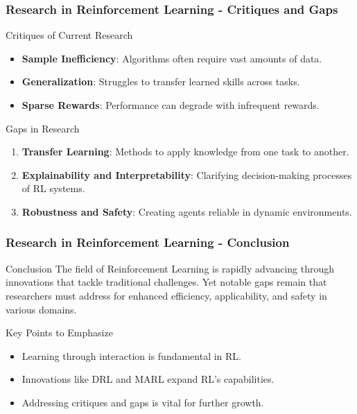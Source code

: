 \documentclass[aspectratio=169]{beamer}
\begin{document}
\begin{frame}[fragile]
    \frametitle{Research in Reinforcement Learning - Critiques and Gaps}
    \begin{block}{Critiques of Current Research}
        \begin{itemize}
            \item \textbf{Sample Inefficiency}: Algorithms often require vast amounts of data.
            \item \textbf{Generalization}: Struggles to transfer learned skills across tasks.
            \item \textbf{Sparse Rewards}: Performance can degrade with infrequent rewards.
        \end{itemize}
    \end{block}

    \begin{block}{Gaps in Research}
        \begin{enumerate}
            \item \textbf{Transfer Learning}: Methods to apply knowledge from one task to another.
            \item \textbf{Explainability and Interpretability}: Clarifying decision-making processes of RL systems.
            \item \textbf{Robustness and Safety}: Creating agents reliable in dynamic environments.
        \end{enumerate}
    \end{block}
\end{frame}

\begin{frame}[fragile]
    \frametitle{Research in Reinforcement Learning - Conclusion}
    \begin{block}{Conclusion}
        The field of Reinforcement Learning is rapidly advancing through innovations that tackle traditional challenges. Yet notable gaps remain that researchers must address for enhanced efficiency, applicability, and safety in various domains.
    \end{block}

    \begin{block}{Key Points to Emphasize}
        \begin{itemize}
            \item Learning through interaction is fundamental in RL.
            \item Innovations like DRL and MARL expand RL's capabilities.
            \item Addressing critiques and gaps is vital for further growth.
        \end{itemize}
    \end{block}
\end{frame}
\end{document}
